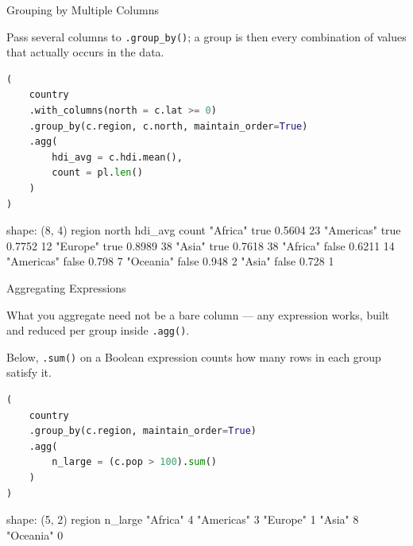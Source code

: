 \documentclass[8pt,aspectratio=169]{beamer}
\begin{document}
\begin{frame}[fragile]{Grouping by Multiple Columns}
\begin{splitcode}{%

Pass several columns to \texttt{.group\_by()}; a group is then every combination of values that actually occurs in the data.

}
\begin{lstlisting}[language=Python]
(
    country
    .with_columns(north = c.lat >= 0)
    .group_by(c.region, c.north, maintain_order=True)
    .agg(
        hdi_avg = c.hdi.mean(),
        count = pl.len()
    )
)
\end{lstlisting}
\begin{codeoutput}
shape: (8, 4)
region      north  hdi_avg  count
"Africa"    true   0.5604   23
"Americas"  true   0.7752   12
"Europe"    true   0.8989   38
"Asia"      true   0.7618   38
"Africa"    false  0.6211   14
"Americas"  false  0.798    7
"Oceania"   false  0.948    2
"Asia"      false  0.728    1
\end{codeoutput}
\end{splitcode}
\end{frame}

\begin{frame}[fragile]{Aggregating Expressions}
\begin{splitcode}{%

What you aggregate need not be a bare column --- any expression works, built and reduced per group inside \texttt{.agg()}.

Below, \texttt{.sum()} on a Boolean expression counts how many rows in each group satisfy it.

}
\begin{lstlisting}[language=Python]
(
    country
    .group_by(c.region, maintain_order=True)
    .agg(
        n_large = (c.pop > 100).sum()
    )
)
\end{lstlisting}
\begin{codeoutput}
shape: (5, 2)
region      n_large
"Africa"    4
"Americas"  3
"Europe"    1
"Asia"      8
"Oceania"   0
\end{codeoutput}
\end{splitcode}
\end{frame}
\end{document}
